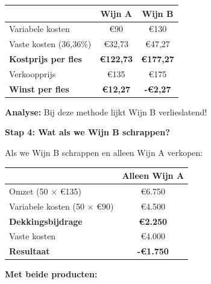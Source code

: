 \documentclass[a4paper,11pt]{article}
\begin{document}
\begin{description}
\begin{oefenblok}
              \begin{tabular}{lcc}
                  \hline
                                              & \textbf{Wijn A}  & \textbf{Wijn B}  \\
                  \hline
                  Variabele kosten            & €90              & €130             \\
                  Vaste kosten (36,36\%)      & €32,73           & €47,27           \\
                  \textbf{Kostprijs per fles} & \textbf{€122,73} & \textbf{€177,27} \\
                  Verkoopprijs                & €135             & €175             \\
                  \textbf{Winst per fles}     & \textbf{€12,27}  & \textbf{-€2,27}  \\
                  \hline
              \end{tabular}

              \textbf{Analyse:} Bij deze methode lijkt Wijn B verlieslatend!

              \textbf{Stap 4: Wat als we Wijn B schrappen?}

              Als we Wijn B schrappen en alleen Wijn A verkopen:

              \begin{tabular}{lc}
                  \hline
                                              & \textbf{Alleen Wijn A} \\
                  \hline
                  Omzet (50 × €135)           & €6.750                 \\
                  Variabele kosten (50 × €90) & €4.500                 \\
                  \textbf{Dekkingsbijdrage}   & \textbf{€2.250}        \\
                  Vaste kosten                & €4.000                 \\
                  \textbf{Resultaat}          & \textbf{-€1.750}       \\
                  \hline
              \end{tabular}

              \textbf{Met beide producten:}


\end{oefenblok}
\end{description}
\end{document}
